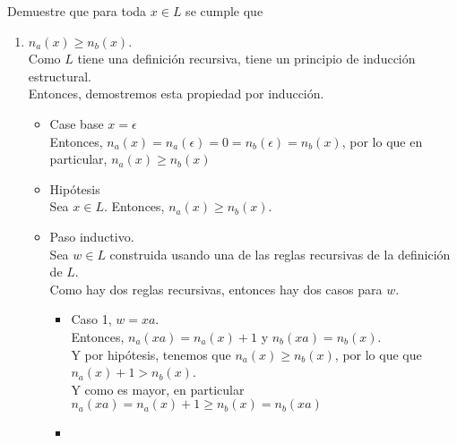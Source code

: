 \documentclass{article}
\begin{document}
\begin{enumerate}
{            Demuestre que para toda $x \in L$ se cumple que
            \begin{enumerate}
                \item {
                    $n_a(x) \geq n_b(x)$.\\
                    Como $L$ tiene una definición recursiva, tiene un principio 
                    de inducción estructural.\\
                    Entonces, demostremos esta propiedad por inducción.
                    \begin{itemize}
                        \item {
                            Case base $x = \epsilon$ \\
                            Entonces, $n_a(x) = n_a(\epsilon) = 0 = 
                            n_b(\epsilon) = n_b(x)$, por lo que en 
                            particular, $n_a(x) \geq n_b(x)$
                        }
                        \item {
                            Hipótesis \\
                            Sea $x \in L$. Entonces, $n_a(x) \geq n_b(x)$.
                        }
                        \item {
                            Paso inductivo.\\
                            Sea $w \in L$ construida usando una de las reglas 
                            recursivas de la definición de $L$.\\
                            Como hay dos reglas recursivas, entonces hay dos 
                            casos para $w$.
                            \begin{itemize}
                                \item {
                                    Caso 1, $w = xa$.\\
                                    Entonces, $n_a(xa) = n_a(x) + 1$ y
                                    $n_b(xa) = n_b(x)$.\\ 
                                    Y por hipótesis, tenemos que 
                                    $n_a(x) \geq n_b(x)$, por lo que que 
                                    $n_a(x) + 1 > n_b(x)$.\\
                                    Y como es mayor, en particular 
                                    $n_a(xa) = n_a(x) + 1 \geq n_b(x) = n_b(xa)$
                                }
                                \item {
}
\end{itemize}}
\end{itemize}}
\end{enumerate}}
\end{enumerate}
\end{document}
